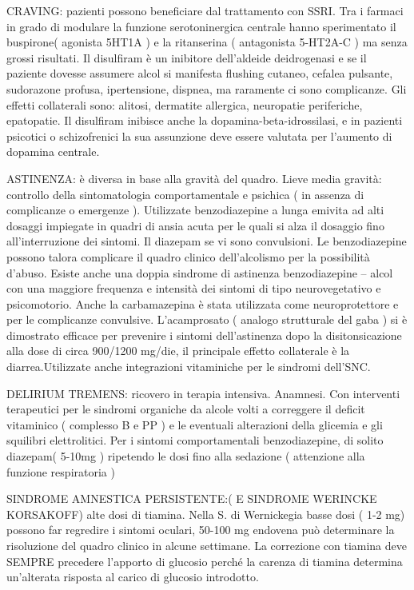 \documentclass[]{article}
\begin{document}
CRAVING: pazienti possono beneficiare dal trattamento con SSRI. Tra i
farmaci in grado di modulare la funzione serotoninergica centrale hanno
sperimentato il buspirone( agonista 5HT1A ) e la ritanserina (
antagonista 5-HT2A-C ) ma senza grossi risultati. Il disulfiram è un
inibitore dell'aldeide deidrogenasi e se il paziente dovesse assumere
alcol si manifesta flushing cutaneo, cefalea pulsante, sudorazone
profusa, ipertensione, dispnea, ma raramente ci sono complicanze. Gli
effetti collaterali sono: alitosi, dermatite allergica, neuropatie
periferiche, epatopatie. Il disulfiram inibisce anche la
dopamina-beta-idrossilasi, e in pazienti psicotici o schizofrenici la
sua assunzione deve essere valutata per l'aumento di dopamina centrale.

ASTINENZA: è diversa in base alla gravità del quadro. Lieve media
gravità: controllo della sintomatologia comportamentale e psichica ( in
assenza di complicanze o emergenze ). Utilizzate benzodiazepine a lunga
emivita ad alti dosaggi impiegate in quadri di ansia acuta per le quali
si alza il dosaggio fino all'interruzione dei sintomi. Il diazepam se vi
sono convulsioni. Le benzodiazepine possono talora complicare il quadro
clinico dell'alcolismo per la possibilità d'abuso. Esiste anche una
doppia sindrome di astinenza benzodiazepine -- alcol con una maggiore
frequenza e intensità dei sintomi di tipo neurovegetativo e
psicomotorio. Anche la carbamazepina è stata utilizzata come
neuroprotettore e per le complicanze convulsive. L'acamprosato ( analogo
strutturale del gaba ) si è dimostrato efficace per prevenire i sintomi
dell'astinenza dopo la disitonsicazione alla dose di circa 900/1200
mg/die, il principale effetto collaterale è la diarrea.Utilizzate anche
integrazioni vitaminiche per le sindromi dell'SNC.

DELIRIUM TREMENS: ricovero in terapia intensiva. Anamnesi. Con
interventi terapeutici per le sindromi organiche da alcole volti a
correggere il deficit vitaminico ( complesso B e PP ) e le eventuali
alterazioni della glicemia e gli squilibri elettrolitici. Per i sintomi
comportamentali benzodiazepine, di solito diazepam( 5-10mg ) ripetendo
le dosi fino alla sedazione ( attenzione alla funzione respiratoria )

SINDROME AMNESTICA PERSISTENTE:( E SINDROME WERINCKE KORSAKOFF) alte
dosi di tiamina. Nella S. di Wernickegia basse dosi ( 1-2 mg) possono
far regredire i sintomi oculari, 50-100 mg endovena può determinare la
risoluzione del quadro clinico in alcune settimane. La correzione con
tiamina deve SEMPRE precedere l'apporto di glucosio perché la carenza di
tiamina determina un'alterata risposta al carico di glucosio introdotto.
\end{document}
